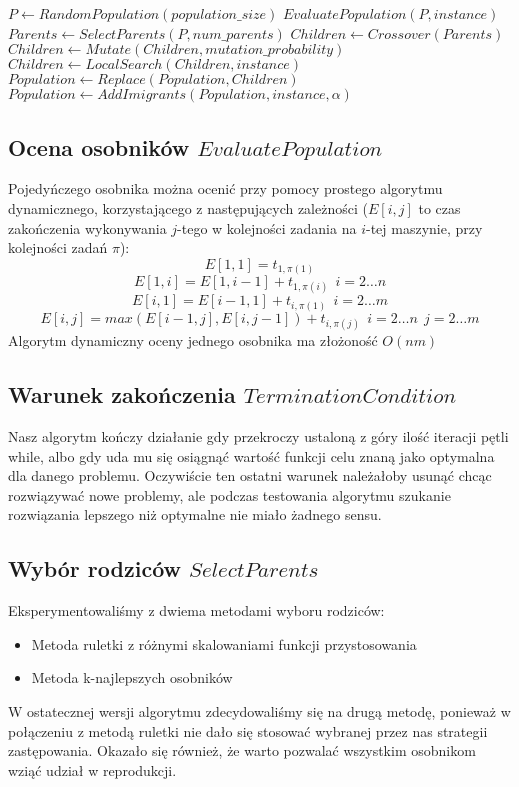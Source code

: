 \documentclass[11pt, a4wide]{article}
\begin{document}
\begin{algorithmic}
  \State $P \gets RandomPopulation(population\_size)$
  \State $EvaluatePopulation(P, instance)$
    \State $Parents \gets SelectParents(P, num\_parents)$ 
    \State $Children \gets Crossover(Parents)$
    \State $Children \gets Mutate(Children, mutation\_probability)$
    \State $Children \gets LocalSearch(Children, instance)$
    \State $Population \gets Replace(Population, Children)$
    \State $Population \gets AddImigrants(Population, instance, \alpha)$
  \EndWhile
\end{algorithmic}

\subsection{Ocena osobników $EvaluatePopulation$}
Pojedyńczego osobnika można ocenić przy pomocy prostego algorytmu dynamicznego, korzystającego
z następujących zależności ($E[i,j]$ to czas zakończenia wykonywania $j$-tego w kolejności zadania
na $i$-tej maszynie, przy kolejności zadań $\pi$):
$$ E[1, 1] = t_{1,\pi(1)} $$
$$ E[1, i] = E[1, i-1] + t_{1,\pi(i)}\ \  i = 2 \ldots n$$
$$ E[i, 1] = E[i-1, 1] + t_{i,\pi(1)}\ \  i = 2 \ldots m$$
$$ E[i, j] = max(E[i-1, j], E[i, j-1]) + t_{i, \pi(j)} \ \ i = 2 \ldots n \ \ j = 2 \ldots m $$
Algorytm dynamiczny oceny jednego osobnika ma złożoność $O(nm)$

\subsection{Warunek zakończenia $TerminationCondition$}
Nasz algorytm kończy działanie gdy przekroczy ustaloną z góry ilość iteracji pętli while, albo
gdy uda mu się osiągnąć wartość funkcji celu znaną jako optymalna dla danego problemu. Oczywiście
ten ostatni warunek należałoby usunąć chcąc rozwiązywać nowe problemy, ale podczas testowania 
algorytmu szukanie rozwiązania lepszego niż optymalne nie miało żadnego sensu.

\subsection{Wybór rodziców $SelectParents$}
Eksperymentowaliśmy z dwiema metodami wyboru rodziców:
\begin{itemize}
  \item Metoda ruletki z różnymi skalowaniami funkcji przystosowania
  \item Metoda k-najlepszych osobników
\end{itemize}
W ostatecznej wersji algorytmu zdecydowaliśmy się na drugą metodę, ponieważ
w połączeniu z metodą ruletki nie dało się stosować wybranej przez nas strategii zastępowania. Okazało 
się również, że warto pozwalać wszystkim osobnikom wziąć udział w reprodukcji.
\end{document}

